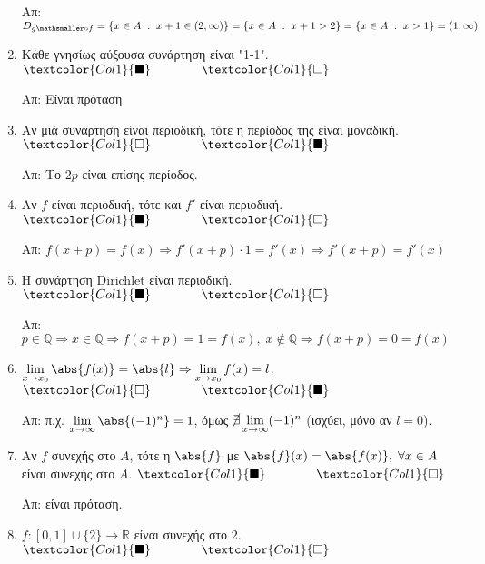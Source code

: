 \documentclass[a4paper,table]{report}
\begin{document}
\begin{enumerate}[itemsep=.5\baselineskip]
    Απ: $ D_{g \mathsmaller\circ f} = \{ x \in A \; : \; x+1 \in (2, \infty) \} = 
    \{ x \in A \; : \; x + 1 > 2 \} = \{ x \in A \; : \; x > 1 \} = (1, \infty) $

  \item \textcolor{Col1}{Κάθε γνησίως αύξουσα συνάρτηση είναι "1-1"}.
    \hfill $\textcolor{Col1}{\blacksquare} \qquad \qquad \textcolor{Col1}{\square}$

    Απ: Είναι πρόταση

  \item \textcolor{Col1}{Αν μιά συνάρτηση είναι περιοδική, τότε η περίοδος της είναι
    μοναδική}.
    \hfill $\textcolor{Col1}{\square} \qquad \qquad \textcolor{Col1}{\blacksquare}$

    Απ: Το $ 2p $ είναι επίσης περίοδος.

  \item \textcolor{Col1}{Αν $f$ είναι περιοδική, τότε και $ f' $ είναι περιοδική}.
    \hfill $\textcolor{Col1}{\blacksquare} \qquad \qquad \textcolor{Col1}{\square}$

    Απ: $ f(x+p)=f(x) \Rightarrow f'(x+p)\cdot 1 = f'(x) \Rightarrow f'(x+p)=f'(x) $

  \item \textcolor{Col1}{Η συνάρτηση Dirichlet είναι περιοδική}.
    \hfill $\textcolor{Col1}{\blacksquare} \qquad \qquad \textcolor{Col1}{\square}$

    Απ: $ p \in \mathbb{Q} \Rightarrow x \in \mathbb{Q} \Rightarrow f(x+p) = 1 = f(x), 
    \; x \not \in \mathbb{Q} \Rightarrow f(x+p)=0=f(x) $

  \item \textcolor{Col1}{$ \lim\limits_{x \to x_{0}} \abs{f(x)} = \abs{l} \Rightarrow
    \lim\limits_{x \to x_{0}} f(x) = l $}.
    \hfill $\textcolor{Col1}{\square} \qquad \qquad \textcolor{Col1}{\blacksquare}$

    Απ: π.χ. $ \lim\limits_{x \to \infty} \abs{(-1)^{n}} = 1 $, όμως 
    $  \cancel{\exists} \lim\limits_{x \to \infty} (-1)^{n} $ \; 
    (ισχύει, μόνο αν $ l=0 $).

  \item \textcolor{Col1}{Αν $f$ συνεχής στο $A$, τότε η $ \abs{f} $ με $ \abs{f}(x) 
    = \abs{f(x)}, \; \forall x \in A $ είναι συνεχής στο $A$}.
    \hfill $\textcolor{Col1}{\blacksquare} \qquad \qquad \textcolor{Col1}{\square}$

    Απ: είναι πρόταση. 

  \item \textcolor{Col1}{$ f \colon [0,1] \cup \{ 2 \} \to \mathbb{R} $ είναι 
    συνεχής στο 2}.
    \hfill $\textcolor{Col1}{\blacksquare} \qquad \qquad \textcolor{Col1}{\square}$


\end{enumerate}
\end{document}
